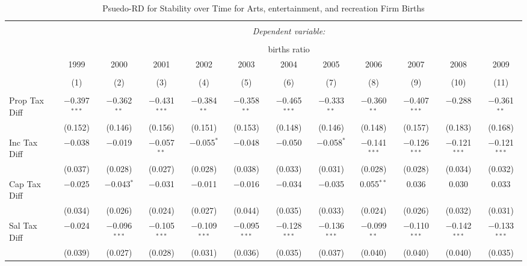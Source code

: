 
\begin{table}[!htbp] \centering 
  \caption{Psuedo-RD for Stability over Time for  Arts, entertainment, and recreation Firm Births} 
  \label{71year} 
\small 
\begin{tabular}{@{\extracolsep{5pt}}lccccccccccc} 
\\[-1.8ex]\hline 
\hline \\[-1.8ex] 
 & \multicolumn{11}{c}{\textit{Dependent variable:}} \\ 
\cline{2-12} 
\\[-1.8ex] & \multicolumn{11}{c}{births ratio} \\ 
 & 1999 & 2000 & 2001 & 2002 & 2003 & 2004 & 2005 & 2006 & 2007 & 2008 & 2009 \\ 
\\[-1.8ex] & (1) & (2) & (3) & (4) & (5) & (6) & (7) & (8) & (9) & (10) & (11)\\ 
\hline \\[-1.8ex] 
 Prop Tax Diff & $-$0.397$^{***}$ & $-$0.362$^{**}$ & $-$0.431$^{***}$ & $-$0.384$^{**}$ & $-$0.358$^{**}$ & $-$0.465$^{***}$ & $-$0.333$^{**}$ & $-$0.360$^{**}$ & $-$0.407$^{***}$ & $-$0.288 & $-$0.361$^{**}$ \\ 
  & (0.152) & (0.146) & (0.156) & (0.151) & (0.153) & (0.148) & (0.146) & (0.148) & (0.157) & (0.183) & (0.168) \\ 
  Inc Tax Diff & $-$0.038 & $-$0.019 & $-$0.057$^{**}$ & $-$0.055$^{*}$ & $-$0.048 & $-$0.050 & $-$0.058$^{*}$ & $-$0.141$^{***}$ & $-$0.126$^{***}$ & $-$0.121$^{***}$ & $-$0.121$^{***}$ \\ 
  & (0.037) & (0.028) & (0.027) & (0.028) & (0.038) & (0.033) & (0.031) & (0.028) & (0.028) & (0.034) & (0.032) \\ 
  Cap Tax Diff & $-$0.025 & $-$0.043$^{*}$ & $-$0.031 & $-$0.011 & $-$0.016 & $-$0.034 & $-$0.035 & 0.055$^{**}$ & 0.036 & 0.030 & 0.033 \\ 
  & (0.034) & (0.026) & (0.024) & (0.027) & (0.044) & (0.035) & (0.033) & (0.024) & (0.026) & (0.032) & (0.031) \\ 
  Sal Tax Diff & $-$0.024 & $-$0.096$^{***}$ & $-$0.105$^{***}$ & $-$0.109$^{***}$ & $-$0.095$^{***}$ & $-$0.128$^{***}$ & $-$0.136$^{***}$ & $-$0.099$^{**}$ & $-$0.110$^{***}$ & $-$0.142$^{***}$ & $-$0.133$^{***}$ \\ 
  & (0.039) & (0.027) & (0.028) & (0.031) & (0.036) & (0.035) & (0.037) & (0.040) & (0.040) & (0.040) & (0.035) \\ 

\end{tabular}
\end{table}
